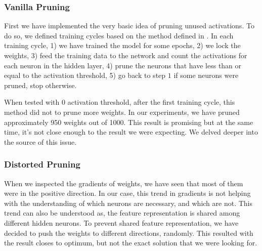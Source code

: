 \subsubsection{Vanilla Pruning}
First we have implemented the very basic idea of pruning unused activations. To do so, we defined training cycles based on the method defined in \cite{Hu:2016aa}. In each training cycle, 1) we have trained the model for some epochs, 2) we lock the weights, 3) feed the training data to the network and count the activations for each neuron in the hidden layer, 4) prune the neurons that have less than or equal to the activation threshold, 5) go back to step $1$ if some neurons were pruned, stop otherwise.

When tested with $0$ activation threshold, after the first training cycle, this method did not to prune more weights. In our experiments, we have pruned approximately 950 weights out of 1000. This result is promising but at the same time, it's not close enough to the result we were expecting. We delved deeper into the source of this issue.


\subsubsection{Distorted Pruning}
When we inspected the gradients of weights, we have seen that most of them were in the positive direction. In our case, this trend in gradients is not helping with the understanding of which neurons are necessary, and which are not. This trend can also be understood as, the feature representation is shared among different hidden neurons. 
To prevent shared feature representation, we have decided to push the weights to different directions, randomly. This resulted with the result closes to optimum, but not the exact solution that we were looking for. 
